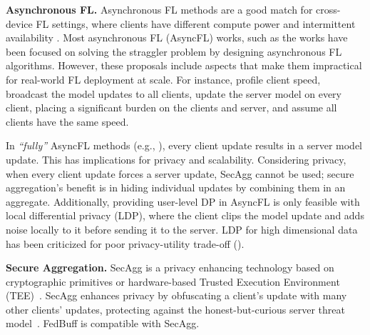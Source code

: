 \documentclass[twoside]{article}
\newcommand{\algname}{{FedBuff}\xspace}
\newcommand{\asyncfl}{{AsyncFL}\xspace}
\newcommand{\secagg}{{SecAgg}\xspace}
\begin{document}
\textbf{Asynchronous FL.}
Asynchronous FL methods are a good match for cross-device FL settings, where clients have different compute power and intermittent availability \citep{fl_field_guide}. Most asynchronous FL (\asyncfl) works, such as the works \citep{fedasync, paper3, paper2, paper1, safa, li2021stragglers} have been focused on solving the straggler problem by designing asynchronous FL algorithms. However, these proposals include aspects that make them impractical for real-world FL deployment at scale. For instance, \cite{paper2, li2021stragglers} profile client speed, \cite{paper1} broadcast the model updates to all clients, \cite{fedasync} update the server model on every client, placing a significant burden on the clients and server, and \cite{paper3} assume all clients have the same speed. 

In \emph{``fully''} \asyncfl methods (e.g., \cite{fedasync}), every client update results in a server model update. This has implications for privacy and scalability. Considering privacy, when every client update forces a server update, \secagg cannot be used; secure aggregation's benefit is in hiding individual updates by combining them in an aggregate. Additionally, providing user-level DP in \asyncfl is only feasible with local differential privacy (LDP), where the client clips the model update and adds noise locally to it before sending it to the server. LDP for high dimensional data has been criticized for poor privacy-utility trade-off (\cite{esa_empirical, prochlo}). 


\textbf{Secure Aggregation.}
SecAgg is a privacy enhancing technology based on cryptographic primitives \citep{secagg, bell2020secure, so2021turbo} or hardware-based Trusted Execution Environment (TEE)~\citep{secagg-sgx}. SecAgg enhances privacy by obfuscating a client's update with many other clients' updates, protecting against the honest-but-curious server threat model~\citep{secagg}. \algname is compatible with SecAgg.
\end{document}
